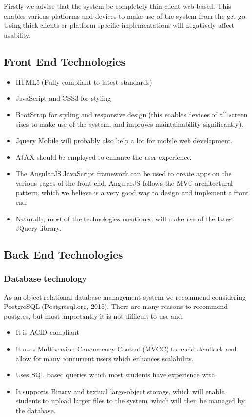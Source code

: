 \begin{description}
	\item Firstly we advise that the system be completely thin client web based. This enables various platforms and devices to make use of the system from the get go. Using thick clients or platform specific implementations will negatively affect usability. 
\end{description}

\subsection{Front End Technologies}

\begin{itemize}
	\item	HTML5 (Fully compliant to latest standards)
	\item	JavaScript and CSS3 for styling
	\item	BootStrap for styling and responsive design (this enables devices of all screen sizes to make use of the system, and improves maintainability significantly). 
	\item	Jquery Mobile will probably also help a lot for mobile web development.
	\item	AJAX should be employed to enhance the user experience. 
	\item	The AngularJS JavaScript framework can be used to create apps on the various pages of the front end. AngularJS follows the MVC architectural pattern, which we believe is a very good way to design and implement a front end.
	\item	Naturally, most of the technologies mentioned will make use of the latest JQuery library. 
\end{itemize}

\subsection{Back End Technologies}

\subsubsection{Database technology}

As an object-relational database management system we recommend considering PostgreSQL (Postgresql.org, 2015). There are many reasons to recommend postgres, but most importantly it is not difficult to use and:

\begin{itemize}
\item	It is ACID compliant
\item	It uses Multiversion Concurrency Control (MVCC) to avoid deadlock and allow for many concurrent users which enhances scalability. 
\item	Uses SQL based queries which most students have experience with. 
\item	It supports Binary and textual large-object storage, which will enable students to upload larger files to the system, which will then be managed by the database. 
\end{itemize}

